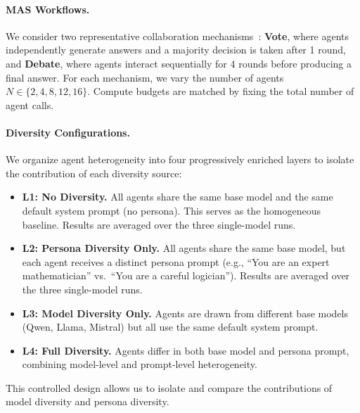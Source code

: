 \documentclass{article}
\theoremstyle{plain}
\theoremstyle{definition}
\theoremstyle{remark}
\begin{document}
\paragraph{MAS Workflows.}
We consider two representative collaboration mechanisms~\citep{choi2025debate}: 
\textbf{Vote}, where agents independently generate answers and a majority decision is taken after 1 round, and 
\textbf{Debate}, where agents interact sequentially for 4 rounds before producing a final answer. 
For each mechanism, we vary the number of agents \(N \in \{2,4,8,12,16\}\). 
Compute budgets are matched by fixing the total number of agent calls.
\vspace{-0.2cm}

\paragraph{Diversity Configurations.}
We organize agent heterogeneity into four progressively enriched layers to isolate the contribution of each diversity source:
\vspace{-0.4cm}
\begin{itemize}[leftmargin=2em] \setlength{\itemsep}{-0.2em}
\item \textbf{L1: No Diversity.} All agents share the same base model and the same default system prompt (no persona). This serves as the homogeneous baseline. Results are averaged over the three single-model runs.
\item \textbf{L2: Persona Diversity Only.} All agents share the same base model, but each agent receives a distinct persona prompt (e.g., ``You are an expert mathematician'' vs.\ ``You are a careful logician''). Results are averaged over the three single-model runs.
\item \textbf{L3: Model Diversity Only.} Agents are drawn from different base models (Qwen, Llama, Mistral) but all use the same default system prompt.
\item \textbf{L4: Full Diversity.} Agents differ in both base model and persona prompt, combining model-level and prompt-level heterogeneity.
\end{itemize}
\vspace{-0.3cm}
This controlled design allows us to isolate and compare the contributions of model diversity and persona diversity.
\end{document}
